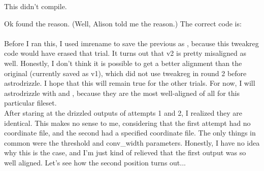 \documentclass[11pt,obeyspaces]{article} %
\begin{document}

\textcolor{red}{}

This didn't compile. \frownie

Ok found the reason. (Well, Alison told me the reason.) The correct code is:\\

\\

Before I ran this, I used imrename to save the previous  as , because this tweakreg code would have erased that trial. It turns out that v2 is pretty misaligned as well. Honestly, I don't think it is possible to get a better alignment than the original (currently saved as v1), which did not use tweakreg in round 2 before astrodrizzle. I hope that this will remain true for the other trials. For now, I will astrodrizzle with  and , because they are the most well-aligned of all for this particular fileset. \\

After staring at the drizzled outputs of attempts 1 and 2, I realized they are identical. This makes no sense to me, considering that the first attempt had no coordinate file, and the second had a specified coordinate file. The only things in common were the threshold and conv\_width parameters. Honestly, I have no idea why this is the case, and I'm just kind of relieved that the first output was so well aligned. Let's see how the second position turns out... \\
\end{document}
